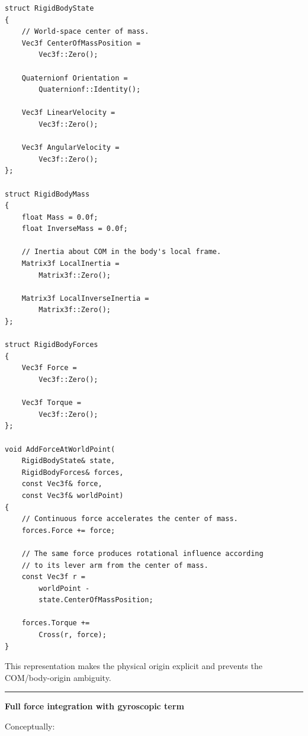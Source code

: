 \begin{verbatim}
struct RigidBodyState
{
    // World-space center of mass.
    Vec3f CenterOfMassPosition =
        Vec3f::Zero();

    Quaternionf Orientation =
        Quaternionf::Identity();

    Vec3f LinearVelocity =
        Vec3f::Zero();

    Vec3f AngularVelocity =
        Vec3f::Zero();
};

struct RigidBodyMass
{
    float Mass = 0.0f;
    float InverseMass = 0.0f;

    // Inertia about COM in the body's local frame.
    Matrix3f LocalInertia =
        Matrix3f::Zero();

    Matrix3f LocalInverseInertia =
        Matrix3f::Zero();
};

struct RigidBodyForces
{
    Vec3f Force =
        Vec3f::Zero();

    Vec3f Torque =
        Vec3f::Zero();
};

void AddForceAtWorldPoint(
    RigidBodyState& state,
    RigidBodyForces& forces,
    const Vec3f& force,
    const Vec3f& worldPoint)
{
    // Continuous force accelerates the center of mass.
    forces.Force += force;

    // The same force produces rotational influence according
    // to its lever arm from the center of mass.
    const Vec3f r =
        worldPoint -
        state.CenterOfMassPosition;

    forces.Torque +=
        Cross(r, force);
}
\end{verbatim}

This representation makes the physical origin explicit and prevents the COM/body-origin ambiguity.

\begin{center}\rule{0.5\linewidth}{0.5pt}\end{center}

\textbf{Full force integration with gyroscopic term}

Conceptually:

